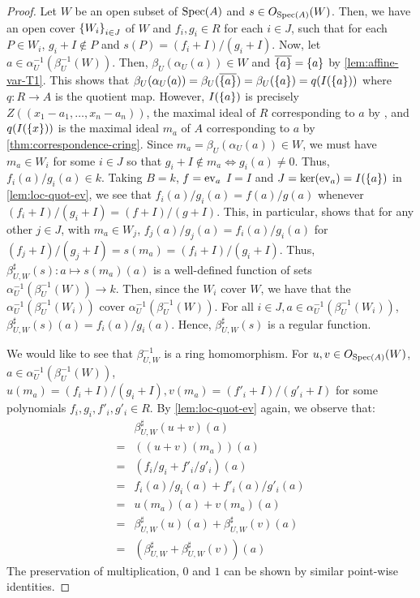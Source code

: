 \begin{proof}
Let $W$ be an open subset of $\mathrm{Spec}(A)$ and $s \in O_{\mathrm{Spec}(A)}(W)$.
Then, we have an open cover $\set{W_i}_{i \in J}$ of $W$ and
$f_i, g_i \in R$ for each $i \in J$, such that for each $P \in W_i$,
$g_i + I \not\in P$ and $s(P) = (f_i + I)/(g_i + I)$. Now, let
$a \in \alpha_{U}^{-1}(\beta_U^{-1}(W))$. Then, $\beta_U(\alpha_U(a)) \in W$
and $\cls{\set{a}} = \set{a}$ by \cref{lem:affine-var-T1}. This shows that
$\beta_U(\alpha_U(a)) = \beta_U(\cls{\set{a}}) = \beta_U(\set{a})
= q(I(\set{a}))$ where $q : R \to A$ is the quotient map.
However, $I(\set{a})$ is precisely $Z((x_1 - a_1, \dots, x_n - a_n))$,
the maximal ideal of $R$ corresponding to $a$ by \cite[Cor. I.1.4]{HartAG},
and $q(I(\set{x}))$ is the maximal ideal $m_a$ of $A$ corresponding
to $a$ by \cref{thm:correspondence-cring}. Since
$m_a = \beta_U(\alpha_U(a)) \in W$, we must have $m_a \in W_i$ for some
$i \in J$ so that $g_i + I \not\in m_a \iff g_i(a) \neq 0$. Thus,
$f_i(a)/g_i(a) \in k$. Taking $B = k$, $f = \mathrm{ev}_a$
$I = I$ and $J = \ker{\ev_a} = I(\set{a})$ in \cref{lem:loc-quot-ev},
we see that $f_i(a)/g_i(a) = f(a)/g(a)$ whenever
$(f_i + I)/(g_i + I) = (f + I)/(g + I)$. This, in particular, shows
that for any other $j \in J$, with $m_a \in W_j$,
$f_j(a)/g_j(a) = f_i(a)/g_i(a)$ for
$(f_j + I)/(g_j + I) = s(m_a) = (f_i + I)/(g_i + I)$.
Thus, $\beta_{U, W}^\sharp(s) : a \mapsto s(m_a)(a)$ is a well-defined function
of sets $\alpha_U^{-1}(\beta_U^{-1}(W)) \to k$. Then,
since the $W_i$ cover $W$, we have that the
$\alpha_U^{-1}(\beta_U^{-1}(W_i))$ cover $\alpha_U^{-1}(\beta_U^{-1}(W))$.
For all $i \in J, a \in \alpha_U^{-1}(\beta_U^{-1}(W_i))$,
$\beta_{U, W}^\sharp(s)(a) = f_i(a)/g_i(a)$. Hence,
$\beta_{U, W}^{\sharp}(s)$ is a regular function.

We would like to see that $\beta_{U, W}^{-1}$ is a ring homomorphism.
For $u, v \in O_{\mathrm{Spec}(A)}(W)$, $a \in \alpha_U^{-1}(\beta_U^{-1}(W))$,
$u(m_a) = (f_i + I)/(g_i + I), v(m_a) = (f'_i + I)/(g'_i +I)$
for some polynomials $f_i, g_i, f'_i, g'_i \in R$.
By \cref{lem:loc-quot-ev} again, we observe that:
\begin{align*}
 & \beta_{U, W}^\sharp(u + v)(a) \\
=& ((u + v)(m_a))(a) \\
=& (f_i/g_i + f'_i/g'_i)(a) \\
=& f_i(a)/g_i(a) + f'_i(a)/g'_i(a) \\
=& u(m_a)(a) + v(m_a)(a) \\
=& \beta_{U, W}^\sharp(u)(a) + \beta_{U, W}^\sharp(v)(a) \\
=& (\beta_{U, W}^\sharp + \beta_{U, W}^\sharp(v))(a)
\end{align*}
The preservation of multiplication, $0$ and $1$ can be shown by
similar point-wise identities.


\end{proof}
